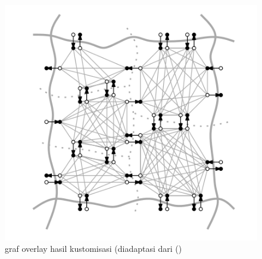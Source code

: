 \begin{figure}[H]
    \centering
    \includegraphics[]{figures/clique.png}
    \caption{graf overlay hasil kustomisasi (diadaptasi dari (\cite{Delling2015})}
    \label{fig:clique-crp}
\end{figure}




